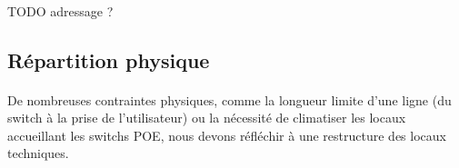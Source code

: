 \paragraph{} TODO adressage ?

\subsection{Répartition physique}

\paragraph{} De nombreuses contraintes physiques, comme la longueur limite d'une
ligne (du switch à la prise de l'utilisateur) ou la nécessité de climatiser les
locaux accueillant les switchs \ac{POE}, nous devons réfléchir à une restructure
des locaux techniques.
